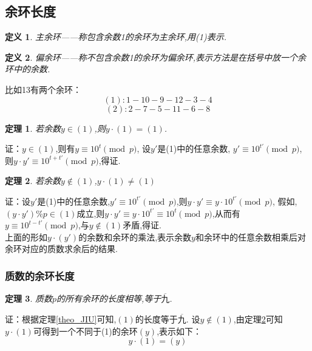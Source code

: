 \documentclass[a4paper]{article}
\newtheorem{defination}{定义}[section]
\newtheorem{theorem}{定理}[section]
\numberwithin{equation}{section}
\begin{document}
\subsection{余环长度}

\begin{defination}主余环——称包含余数1的余环为主余环,用(1)表示.\end{defination}
\begin{defination}偏余环——称不包含余数1的余环为偏余环,表示方法是在括号中放一个余环中的余数.\end{defination}
比如13有两个余环：
\begin{displaymath}(1): 1- 10- 9- 12- 3- 4\end{displaymath}
\begin{displaymath}(2): 2- 7- 5- 11- 6- 8\end{displaymath}

\begin{theorem} \label{theo_yin1} 若余数$y\in(1)$,则$y\cdot (1)= (1)$.\end{theorem} 
证：$y\in(1)$,则有$y\equiv 10^t\pmod{p}$, 设$y'$是(1)中的任意余数, $y' \equiv 10^{t'}\pmod{p}$,  
则$y\cdot y' \equiv 10^{t+t'} \pmod{p}$,得证.

\begin{theorem} \label{theo_ynotin1} 若余数$y\notin(1)$,$y\cdot(1)\ne(1)$\end{theorem} 
	证：设$y'$是(1)中的任意余数,$y'\equiv10^{t'}\pmod{p}$,则$y\cdot y'\equiv y\cdot 10^{t'}\pmod{p}$,
假如,$(y\cdot y')\%{p}\in(1)$成立,则$y\cdot y' \equiv y\cdot 10^{t'} \equiv 10^{t} \pmod{p}$,从而有$y\equiv 10^{t-t'} \pmod{p}$,与$y\notin(1)$矛盾,得证.
\\ \indent 上面的形如$y\cdot (y')$的余数和余环的乘法,表示余数$y$和余环中的任意余数相乘后对余环对应的质数求余后的结果.

\subsubsection{质数的余环长度}

\begin{theorem} \label{theo_ringEqual} 质数$p$的所有余环的长度相等,等于$\overline{九}$.\end{theorem} 
证：根据定理\ref{theo_JIU}可知,$(1)$的长度等于$\overline{九}$.
设$y\notin(1)$,由定理\ref{theo_ynotin1}可知$y\cdot(1)$可得到一个不同于(1)的余环$(y)$,表示如下：
\begin{displaymath} y\cdot(1)=(y) \end{displaymath}
\end{document}
